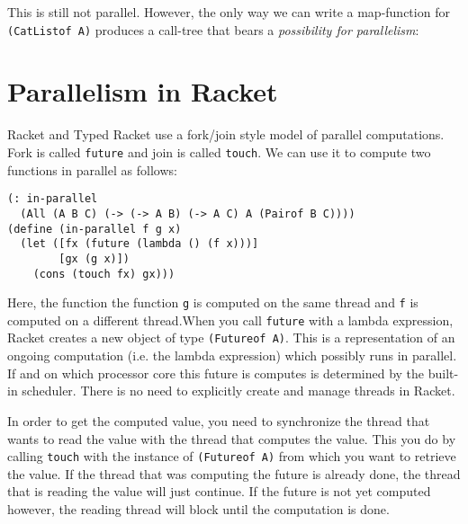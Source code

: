\documentclass{article}
\begin{document}
This is still not parallel. However, the only way we can write a map-function for \lstinline{(CatListof A)} produces a call-tree that bears a \emph{possibility for parallelism}:

\begin{center}
\end{center}

\section{Parallelism in Racket}

Racket and Typed Racket use a fork/join style model of parallel computations. Fork is called \lstinline{future} and join is called \lstinline{touch}. We can use it to compute two functions in parallel as follows:

\begin{lstlisting}
(: in-parallel
  (All (A B C) (-> (-> A B) (-> A C) A (Pairof B C))))
(define (in-parallel f g x)
  (let ([fx (future (lambda () (f x)))]
        [gx (g x)])
    (cons (touch fx) gx)))
\end{lstlisting}

Here, the function the function \lstinline{g} is computed on the same thread and \lstinline{f} is computed on a different thread.When you call \lstinline{future} with a lambda expression, Racket creates a new object of type \lstinline{(Futureof A)}. This is a representation of an ongoing computation (i.e. the lambda expression) which possibly runs in parallel. If and on which processor core this future is computes is determined by the built-in scheduler. There is no need to explicitly create and manage threads in Racket.

In order to get the computed value, you need to synchronize the thread that wants to read the value with the thread that computes the value. This you do by calling \lstinline{touch} with the instance of \lstinline{(Futureof A)} from which you want to retrieve the value. If the thread that was computing the future is already done, the thread that is reading the value will just continue. If the future is not yet computed however, the reading thread will block until the computation is done.
\end{document}

